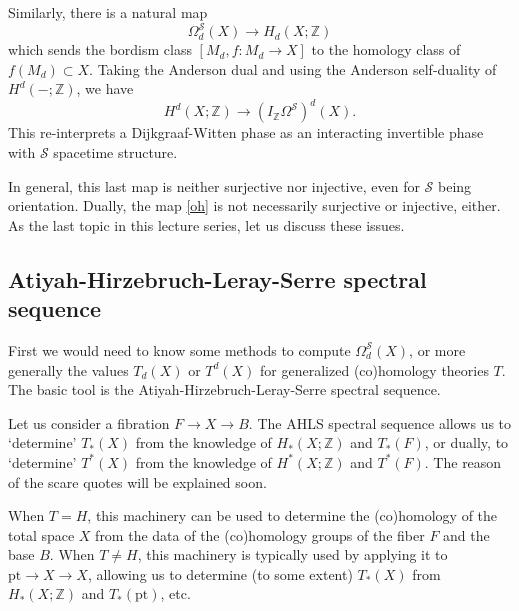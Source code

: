 \documentclass[12pt]{article}
\numberwithin{equation}{section}
\numberwithin{figure}{section}
\theoremstyle{remark}
\def\bZ{\mathbb{Z}}
\def\cS{\mathcal{S}}
\def\pt{\mathrm{pt}}
\begin{document}
Similarly, there is a natural map \begin{equation}
\Omega^\cS_d(X) \to H_d(X;\bZ) \label{oh}
\end{equation} which sends the bordism class $[M_d, f: M_d\to X]$
to the homology class of $f(M_d) \subset X$.
Taking the Anderson dual and using the Anderson self-duality of $H^d(-;\bZ)$,
we have \begin{equation}
H^d(X;\bZ) \to (I_\bZ \Omega^\cS)^d(X).
\end{equation}
This re-interprets a Dijkgraaf-Witten phase as an interacting invertible phase with $\cS$ spacetime structure.

In general, this last map is neither surjective nor injective, even for $\cS$ being orientation.
Dually, the map \eqref{oh} is not necessarily surjective or injective, either.
As the last topic in this lecture series, let us discuss these issues.

\subsection{Atiyah-Hirzebruch-Leray-Serre spectral sequence}

First we would need to know some methods to compute $\Omega^\cS_d(X)$, or 
more generally the values $T_d(X)$ or $T^d(X)$ for generalized (co)homology theories $T$.
The basic tool is the Atiyah-Hirzebruch-Leray-Serre spectral sequence. 

Let us consider a fibration $F\to X\to B$. 
The AHLS spectral sequence allows us to `determine' 
$T_*(X)$  from the knowledge of $H_*(X;\bZ)$ and $T_*(F)$,
or dually,
to `determine' $T^*(X)$ from the knowledge of $H^*(X;\bZ)$ and $T^*(F)$.
The reason of the scare quotes will be explained soon.

When $T=H$, this machinery can be used to determine the (co)homology of the total space $X$ 
from the data of the (co)homology groups of the fiber $F$ and the base $B$.
When $T\neq H$, this machinery is typically used by applying it to $\pt \to X\to X$,
allowing us to determine (to some extent) $T_*(X)$ from $H_*(X;\bZ)$ and $T_*(\pt)$, etc.
\end{document}
